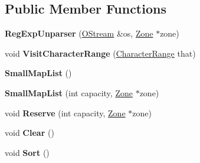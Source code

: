 \subsection*{Public Member Functions}
\begin{DoxyCompactItemize}
\item 
\hypertarget{classv8_1_1internal_1_1_v8___f_i_n_a_l_ab2d6427d40b87b9c24c1d91f2efc5f89}{}{\bfseries Reg\+Exp\+Unparser} (\hyperlink{classv8_1_1internal_1_1_o_stream}{O\+Stream} \&os, \hyperlink{classv8_1_1internal_1_1_zone}{Zone} $\ast$zone)\label{classv8_1_1internal_1_1_v8___f_i_n_a_l_ab2d6427d40b87b9c24c1d91f2efc5f89}

\item 
\hypertarget{classv8_1_1internal_1_1_v8___f_i_n_a_l_a44c44d7759bf7420ca68d4dc39921523}{}void {\bfseries Visit\+Character\+Range} (\hyperlink{classv8_1_1internal_1_1_character_range}{Character\+Range} that)\label{classv8_1_1internal_1_1_v8___f_i_n_a_l_a44c44d7759bf7420ca68d4dc39921523}

\item 
\hypertarget{classv8_1_1internal_1_1_v8___f_i_n_a_l_ad4f103faf6e9162769191aac1f2930ee}{}{\bfseries Small\+Map\+List} ()\label{classv8_1_1internal_1_1_v8___f_i_n_a_l_ad4f103faf6e9162769191aac1f2930ee}

\item 
\hypertarget{classv8_1_1internal_1_1_v8___f_i_n_a_l_a3eb31c082059688d6b90b4f1c0b9a653}{}{\bfseries Small\+Map\+List} (int capacity, \hyperlink{classv8_1_1internal_1_1_zone}{Zone} $\ast$zone)\label{classv8_1_1internal_1_1_v8___f_i_n_a_l_a3eb31c082059688d6b90b4f1c0b9a653}

\item 
\hypertarget{classv8_1_1internal_1_1_v8___f_i_n_a_l_a4a25afc7c3315608a35ee54db9126da5}{}void {\bfseries Reserve} (int capacity, \hyperlink{classv8_1_1internal_1_1_zone}{Zone} $\ast$zone)\label{classv8_1_1internal_1_1_v8___f_i_n_a_l_a4a25afc7c3315608a35ee54db9126da5}

\item 
\hypertarget{classv8_1_1internal_1_1_v8___f_i_n_a_l_aacdcb71d46d1c976625a16d1254adcfb}{}void {\bfseries Clear} ()\label{classv8_1_1internal_1_1_v8___f_i_n_a_l_aacdcb71d46d1c976625a16d1254adcfb}

\item 
\hypertarget{classv8_1_1internal_1_1_v8___f_i_n_a_l_af59d5903402f4225bd97b4fbe6b901c3}{}void {\bfseries Sort} ()\label{classv8_1_1internal_1_1_v8___f_i_n_a_l_af59d5903402f4225bd97b4fbe6b901c3}


\end{DoxyCompactItemize}
